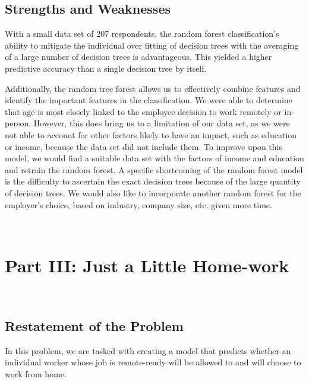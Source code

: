 \documentclass{article}
\begin{document}
\subsection{Strengths and Weaknesses}
\indent
With a small data set of 207 respondents, the random forest classification’s ability to mitigate the individual over fitting of decision trees with the averaging of a large number of decision trees is advantageous. This yielded a higher predictive accuracy than a single decision tree by itself. 

\indent
Additionally, the random tree forest allows us to effectively combine features and identify the important features in the classification. We were able to determine that age is most closely linked to the employee decision to work remotely or in-person. However, this does bring us to a limitation of our data set, as we were not able to account for other factors likely to have an impact, such as education or income, because the data set did not include them. To improve upon this model, we would find a suitable data set with the factors of income and education and retrain the random forest. A specific shortcoming of the random forest model is the difficulty to ascertain the exact decision trees because of the large quantity of decision trees. We would also like to incorporate another random forest for the employer’s choice, based on industry, company size, etc. given more time.

\

\section{Part III: Just a Little Home-work}
\

\subsection{Restatement of the Problem}
In this problem, we are tasked with creating a model that predicts whether an individual worker whose job is remote-ready will be allowed to and will choose to work from home.
\
\end{document}
